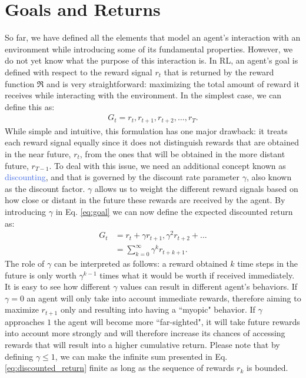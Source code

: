 \section{Goals and Returns}
\label{sec:goals_and_returns}
So far, we have defined all the elements that model an agent's interaction with an environment while introducing some of its fundamental properties. However, we do not yet know what the purpose of this interaction is. In RL, an agent's goal is defined with respect to the reward signal $r_t$ that is returned by the reward function $\Re$ and is very straightforward: maximizing the total amount of reward it receives while interacting with the environment. In the simplest case, we can define this as:
\begin{align}
	G_t = r_t, r_{t+1}, r_{t+2}, \ldots, r_{T}.
\label{eq:goal}
\end{align}
While simple and intuitive, this formulation has one major drawback: it treats each reward signal equally since it does not distinguish rewards that are obtained in the near future, $r_t$, from the ones that will be obtained in the more distant future, $r_{T-1}$. To deal with this issue, we need an additional concept known as \textcolor{RoyalBlue}{discounting}, and that is governed by the discount rate parameter $\gamma$, also known as the discount factor. $\gamma$ allows us to weight the different reward signals based on how close or distant in the future these rewards are received by the agent. By introducing $\gamma$ in Eq. \ref{eq:goal} we can now define the expected discounted return as:
\begin{align}
	G_t & = r_t+\gamma r_{t+1}, \gamma^{2} r_{t+2} + ... \\
	    & = \sum_{k=0}^{\infty}\gamma^{k} r_{t+k+1}.
\label{eq:discounted_return}
\end{align}
The role of $\gamma$ can be interpreted as follows: a reward obtained $k$ time steps in the future is only worth $\gamma^{k-1}$ times what it would be worth if received immediately. It is easy to see how different $\gamma$ values can result in different agent's behaviors. If $\gamma=0$ an agent will only take into account immediate rewards, therefore aiming to maximize $r_{t+1}$ only and resulting into having a ``myopic" behavior. If $\gamma$ approaches $1$ the agent will become more ``far-sighted", it will take future rewards into account more strongly and will therefore increase its chances of accessing rewards that will result into a higher cumulative return. 
Please note that by defining $\gamma \leq 1$, we can make the infinite sum presented in Eq. \ref{eq:discounted_return} finite as long as the sequence of rewards $r_k$ is bounded.   

